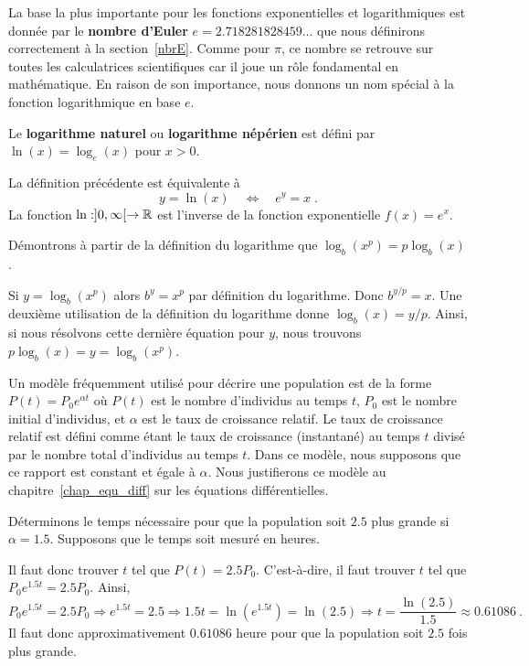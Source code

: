 {La base la plus importante pour les fonctions exponentielles et
logarithmiques est donnée par le {\bfseries nombre d'Euler}
$e = 2.718281828459\ldots$ que nous définirons correctement à la
section~\ref{nbrE}.  Comme pour $\pi$, ce nombre se retrouve sur
toutes les calculatrices scientifiques car il joue un rôle fondamental
en mathématique.  En raison de son importance, nous donnons un nom spécial
à la fonction logarithmique en base $e$.

\begin{focus}{\dfn} 
Le {\bfseries logarithme naturel} ou {\bfseries logarithme népérien}
est défini par $\ln(x) = \log_e(x)$ pour $x>0$.
\end{focus}

La définition précédente est équivalente à
\[
y=\ln(x) \quad \Leftrightarrow \quad e^y = x \; .
\]
La fonction $\ln:]0,\infty[\rightarrow \mathbb{R}$ est l'inverse de la fonction
exponentielle $f(x) = e^x$.

\begin{egg}
Démontrons à partir de la définition du logarithme que
$\log_b(x^p) = p \log_b(x)$.

Si $y = \log_b(x^p)$ alors $b^y = x^p$ par définition du logarithme.
Donc $b^{y/p} = x$.  Une deuxième utilisation de la définition du
logarithme donne $\log_b(x) = y/p$.  Ainsi, si nous résolvons cette
dernière équation pour $y$, nous trouvons $p\log_b(x) = y = \log_b(x^p)$.
\end{egg}

\begin{egg}
Un modèle fréquemment utilisé pour décrire une population est de la
forme $P(t) = P_0 e^{\alpha t}$ où $P(t)$ est le nombre d'individus au
temps $t$, $P_0$ est le nombre initial d'individus, et $\alpha$ est le
\lgm taux de croissance relatif\rgm.  Le taux de croissance relatif
est défini comme étant le taux de croissance (instantané) au temps $t$
divisé par le nombre total d'individus au temps $t$.  Dans ce modèle,
nous supposons que ce rapport est constant et égale à $\alpha$.  Nous
justifierons ce modèle au chapitre~\ref{chap_equ_diff} sur les équations
différentielles.

Déterminons le temps nécessaire pour que la population soit
$2.5$ plus grande si $\alpha =1.5$.  Supposons que le temps soit
mesuré en heures.

Il faut donc trouver $t$ tel que $\displaystyle P(t) = 2.5 P_0$.
C'est-à-dire, il faut trouver $t$ tel que $P_0 e^{1.5 t}  = 2.5 P_0$.  Ainsi,
\[
P_0 e^{1.5 t}  = 2.5 P_0 \Rightarrow e^{1.5 t}  = 2.5
\Rightarrow 1.5 t = \ln\left( e^{1.5 t} \right) = \ln(2.5)
\Rightarrow t = \frac{\ln(2.5)}{1.5} \approx 0.61086 \ .
\]
Il faut donc approximativement $0.61086$ heure pour que la population
soit $2.5$ fois plus grande.


\end{egg}}

